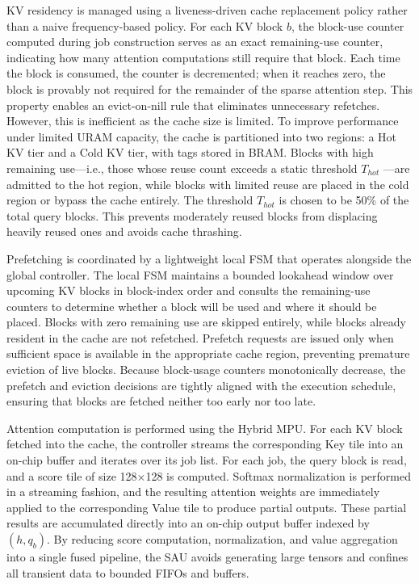 \documentclass[conference]{IEEEtran}
\begin{document}
KV residency is managed using a liveness-driven cache replacement policy rather than a naive frequency-based policy. For each KV block $b$, the block-use counter computed during job construction serves as an exact remaining-use counter, indicating how many attention computations still require that block. Each time the block is consumed, the counter is decremented; when it reaches zero, the block is provably not required for the remainder of the sparse attention step. This property enables an evict-on-nill rule that eliminates unnecessary refetches. However, this is inefficient as the cache size is limited. To improve performance under limited URAM capacity, the cache is partitioned into two regions: a Hot KV tier and a Cold KV tier, with tags stored in BRAM. Blocks with high remaining use—i.e., those whose reuse count exceeds a static threshold $T_{hot}$
—are admitted to the hot region, while blocks with limited reuse are placed in the cold region or bypass the cache entirely. The threshold $T_{hot}$ is chosen to be 50\% of the total query blocks.
This prevents moderately reused blocks from displacing heavily reused ones and avoids cache thrashing.

Prefetching is coordinated by a lightweight local FSM that operates alongside the global controller. The local FSM maintains a bounded lookahead window over upcoming KV blocks in block-index order and consults the remaining-use counters to determine whether a block will be used and where it should be placed. Blocks with zero remaining use are skipped entirely, while blocks already resident in the cache are not refetched. Prefetch requests are issued only when sufficient space is available in the appropriate cache region, preventing premature eviction of live blocks. Because block-usage counters monotonically decrease, the prefetch and eviction decisions are tightly aligned with the execution schedule, ensuring that blocks are fetched neither too early nor too late.

Attention computation is performed using the Hybrid MPU. For each KV block fetched into the cache, the controller streams the corresponding Key tile into an on-chip buffer and iterates over its job list. For each job, the query block is read, and a score tile of size 128×128 is computed. Softmax normalization is performed in a streaming fashion, and the resulting attention weights are immediately applied to the corresponding Value tile to produce partial outputs. These partial results are accumulated directly into an on-chip output buffer indexed by $(h,q_b)$. By reducing score computation, normalization, and value aggregation into a single fused pipeline, the SAU avoids generating large tensors and confines all transient data to bounded FIFOs and buffers.
\end{document}
